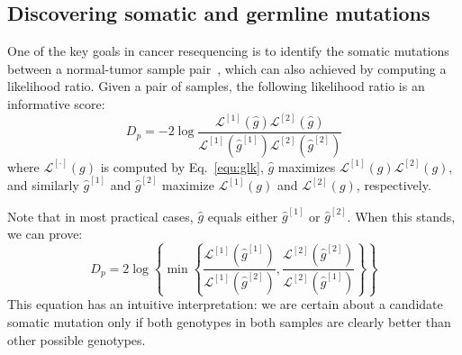 \documentclass{bioinfo}
\begin{document}
\begin{methods}

\subsection{Discovering somatic and germline mutations}
One of the key goals in cancer resequencing is to identify the somatic
mutations between a normal-tumor sample pair~\citep{Robison:2010ys}, which can
also achieved by computing a likelihood ratio.  Given a pair of samples, 
the following likelihood ratio is an informative score:
\begin{equation}\label{eq:dp}
D_p=-2\log\frac{\mathcal{L}^{[1]}(\hat{g})\mathcal{L}^{[2]}(\hat{g})}{\mathcal{L}^{[1]}(\hat{g}^{[1]})\mathcal{L}^{[2]}(\hat{g}^{[2]})}
\end{equation}
where $\mathcal{L}^{[\cdot]}(g)$ is computed by Eq.~\eqref{equ:glk}, $\hat{g}$
maximizes $\mathcal{L}^{[1]}(g)\mathcal{L}^{[2]}(g)$, and similarly
$\hat{g}^{[1]}$ and $\hat{g}^{[2]}$ maximize $\mathcal{L}^{[1]}(g)$ and
$\mathcal{L}^{[2]}(g)$, respectively.

Note that in most practical cases, $\hat{g}$ equals either
$\hat{g}^{[1]}$ or $\hat{g}^{[2]}$.  When this stands, we can prove:
$$
D_p=2\log\left\{ \min\left\{\frac{\mathcal{L}^{[1]}(\hat{g}^{[1]})}{\mathcal{L}^{[1]}(\hat{g}^{[2]})},\frac{\mathcal{L}^{[2]}(\hat{g}^{[2]})}{\mathcal{L}^{[2]}(\hat{g}^{[1]})}\right\}\right\}
$$
This equation has an intuitive interpretation: we are certain about a candidate
somatic mutation only if both genotypes in both samples are clearly better
than other possible genotypes.


\end{methods}
\end{document}

